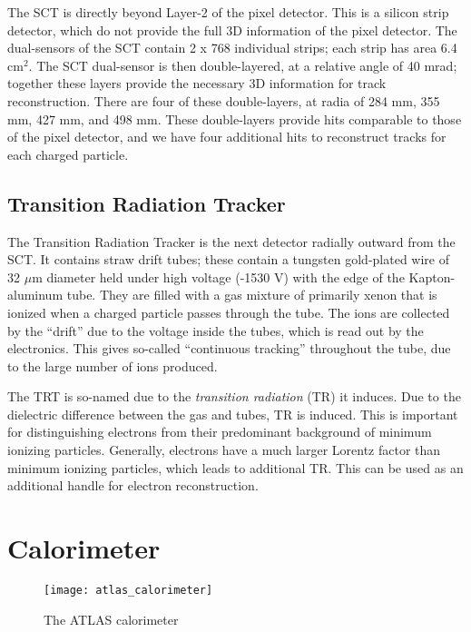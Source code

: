 The SCT is directly beyond Layer-2 of the pixel detector.
This is a silicon strip detector, which do not provide the full 3D information of the pixel detector.
The dual-sensors of the SCT contain 2 x 768 individual strips; each strip has area 6.4 cm$^2$.
The SCT dual-sensor is then double-layered, at a relative angle of 40 mrad; together these layers provide the necessary 3D information for track reconstruction.
There are four of these double-layers, at radia of 284 mm, 355 mm, 427 mm, and 498 mm.
These double-layers provide hits comparable to those of the pixel detector, and we have four additional hits to reconstruct tracks for each charged particle.

\subsection{Transition Radiation Tracker}

The Transition Radiation Tracker is the next detector radially outward from the SCT.
It contains straw drift tubes; these contain a tungsten gold-plated wire of 32 $\mu$m diameter held under high voltage (-1530 V) with the edge of the Kapton-aluminum tube.
They are filled with a gas mixture of primarily xenon that is ionized when a charged particle passes through the tube.
The ions are collected by the ``drift'' due to the voltage inside the tubes, which is read out by the electronics.
This gives so-called ``continuous tracking'' throughout the tube, due to the large number of ions produced.

The TRT is so-named due to the \textit{transition radiation} (TR) it induces.
Due to the dielectric difference between the gas and tubes, TR is induced.
This is important for distinguishing electrons from their predominant background of minimum ionizing particles.
Generally, electrons have a much larger Lorentz factor than minimum ionizing particles, which leads to additional TR.
This can be used as an additional handle for electron reconstruction.

\section{Calorimeter}

\begin{figure}
\caption{The ATLAS calorimeter} \label{fig:atlas_calorimeter}
\texttt{[image: atlas\_calorimeter]}
\end{figure}


